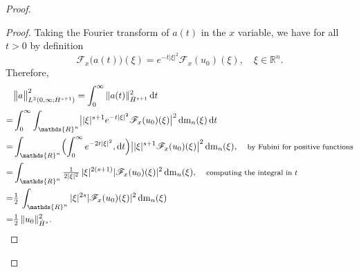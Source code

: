 \documentclass[a4paper, 12pt]{article}
\theoremstyle{plain}
\theoremstyle{definition}
\theoremstyle{remark}
\numberwithin{equation}{section}
\begin{document}
\begin{proof}
\begin{proof}
Taking the Fourier transform of $a(t)$ in the $x$ variable, we have for all $t>0$ by definition
\[
{\mathscr{F}}_x\bigl(a(t)\bigr)(\xi)=e^{-t|\xi|^2}{\mathscr{F}}_x(u_0)(\xi),\quad \xi\in{\mathds{R}}^n.
\]
Therefore,
%
\begin{align*}
&\bigl\|a\bigr\|_{L^2(0,\infty;\dot H^{s+1})}^2= \int_0^\infty \|a(t)\|_{\dot H^{s+1}}^2\, {\rm d}t\\
=&
\int_0^\infty \int_{{\mathds{R}}^n}\bigl||\xi|^{s+1}e^{-t|\xi|^2}{\mathscr{F}}_x(u_0)(\xi)\bigr|^2\, {\rm dm}_n(\xi)\, {\rm d}t\\
=&\int_{{\mathds{R}}^n}\Bigl(\int_0^\infty e^{-2t|\xi|^2}, {\rm d}t \Bigr) \bigl||\xi|^{s+1}{\mathscr{F}}_x(u_0)(\xi)\bigr|^2\, {\rm dm}_n(\xi),
\quad \mbox{\footnotesize by Fubini for positive functions}\\
=&\int_{{\mathds{R}}^n}\tfrac{1}{2|\xi|^2}\,|\xi|^{2(s+1)}|{\mathscr{F}}_x(u_0)(\xi)|^2\, {\rm dm}_n(\xi),
\quad \mbox{\footnotesize computing the integral in $t$}\\
=&\tfrac{1}{2}\,\int_{{\mathds{R}}^n}|\xi|^{2s}|{\mathscr{F}}_x(u_0)(\xi)|^2\, {\rm dm}_n(\xi)\\
=&\tfrac{1}{2}\,\|u_0\|_{\dot H^s}^2. \qedhere
\end{align*}
\end{proof}


\end{proof}
\end{document}
